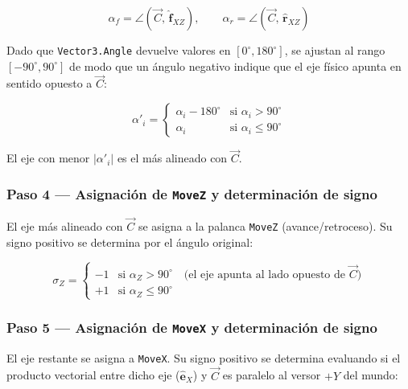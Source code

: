 \begin{equation}
    \alpha_f = \angle(\overrightarrow{C},\, \hat{\mathbf{f}}_{XZ}), \qquad
    \alpha_r = \angle(\overrightarrow{C},\, \hat{\mathbf{r}}_{XZ})
    \label{eq:angles}
\end{equation}

Dado que \texttt{Vector3.Angle} devuelve valores en $[0^{\circ}, 180^{\circ}]$, se ajustan al
rango $[-90^{\circ}, 90^{\circ}]$ de modo que un ángulo negativo indique que el eje físico
apunta en sentido opuesto a $\overrightarrow{C}$:

\begin{equation}
    \alpha'_i =
    \begin{cases}
        \alpha_i - 180^{\circ} & \text{si } \alpha_i > 90^{\circ} \\
        \alpha_i        & \text{si } \alpha_i \leq 90^{\circ}
    \end{cases}
    \label{eq:adj_angles}
\end{equation}

El eje con menor $|\alpha'_i|$ es el más alineado con $\overrightarrow{C}$.

\subsubsection*{Paso 4 --- Asignación de \texttt{MoveZ} y determinación de signo}

El eje más alineado con $\overrightarrow{C}$ se asigna a la palanca
\texttt{MoveZ} (avance/retroceso). Su signo positivo se determina por el ángulo
original:

\begin{equation}
    \sigma_Z =
    \begin{cases}
        -1 & \text{si } \alpha_Z > 90^{\circ} \quad \text{(el eje apunta al lado opuesto de } \overrightarrow{C}\text{)} \\
        +1 & \text{si } \alpha_Z \leq 90^{\circ}
    \end{cases}
    \label{eq:signZ}
\end{equation}

\subsubsection*{Paso 5 --- Asignación de \texttt{MoveX} y determinación de signo}

El eje restante se asigna a \texttt{MoveX}. Su signo positivo se determina
evaluando si el producto vectorial entre dicho eje ($\hat{\mathbf{e}}_X$) y
$\overrightarrow{C}$ es paralelo al versor $+Y$ del mundo:

